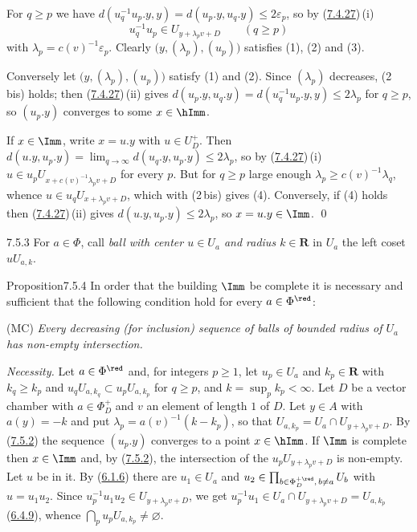 \documentclass[12pt,a4paper,oneside,english]{smfart}
\makeatletter
\newcommand{\btanchor}[1]{\leavevmode\Hy@raisedlink{\hypertarget{bt:#1}{}}}
\newcommand{\btref}[1]{\hyperlink{bt:#1}{#1}}
\theoremstyle{definition}
\theoremstyle{bt}
\makeatother
\begin{document}
For $q\geqslant p$ we have $d(u_q^{-1}u_p.y,y)=d(u_p.y,u_q.y)\leqslant2\varepsilon_p$,
so by (\btref{7.4.27})\,(i)
\begin{equation}
  u_q^{-1}u_p\in U_{y+\lambda_pv+D}\qquad(q\geqslant p) \tag{2\,bis}
\end{equation}
with $\lambda_p=c(v)^{-1}\varepsilon_p$. Clearly $\bigl(y,(\lambda_p),(u_p)\bigr)$
satisfies (1), (2) and (3).

Conversely let $\bigl(y,(\lambda_p),(u_p)\bigr)$ satisfy (1) and (2). Since
$(\lambda_p)$ decreases, (2\,bis) holds; then (\btref{7.4.27})\,(ii) gives
$d(u_p.y,u_q.y)=d(u_q^{-1}u_p.y,y)\leqslant2\lambda_p$ for $q\geqslant p$, so
$(u_p.y)$ converges to some $x\in\hImm$.

If $x\in\Imm$, write $x=u.y$ with $u\in U_D^{+}$. Then
$d(u.y,u_p.y)=\lim_{q\to\infty}d(u_q.y,u_p.y)\leqslant2\lambda_p$, so by
(\btref{7.4.27})\,(i) $u\in u_pU_{x+c(v)^{-1}\lambda_pv+D}$ for every $p$. But for
$q\geqslant p$ large enough $\lambda_p\geqslant c(v)^{-1}\lambda_q$, whence
$u\in u_qU_{x+\lambda_pv+D}$, which with (2\,bis) gives (4). Conversely, if (4)
holds then (\btref{7.4.27})\,(ii) gives $d(u.y,u_p.y)\leqslant2\lambda_p$, so
$x=u.y\in\Imm$. \qed

\num{7.5.3}\btanchor{7.5.3} For $a\in\Phi$, call \emph{ball with center $u\in U_a$ and radius
$k\in\mathbf{R}$} in $U_a$ the left coset $uU_{a,k}$.

\begin{stmt}{Proposition}{7.5.4}\btanchor{7.5.4}
In order that the building $\Imm$ be complete it is necessary and sufficient that
the following condition hold for every $a\in\Phi^{\red}$:

\smallskip
\noindent\textup{(MC)} \emph{Every decreasing (for inclusion) sequence of balls of
bounded radius of $U_a$ has non-empty intersection.}
\end{stmt}

\pf \emph{Necessity.} Let $a\in\Phi^{\red}$ and, for integers $p\geqslant1$, let
$u_p\in U_a$ and $k_p\in\mathbf{R}$ with $k_q\geqslant k_p$ and
$u_qU_{a,k_q}\subset u_pU_{a,k_p}$ for $q\geqslant p$, and $k=\sup_pk_p<\infty$. Let
$D$ be a vector chamber with $a\in\Phi_D^{+}$ and $v$ an element of length $1$ of
$D$. Let $y\in A$ with $a(y)=-k$ and put $\lambda_p=a(v)^{-1}(k-k_p)$, so that
$U_{a,k_p}=U_a\cap U_{y+\lambda_pv+D}$. By (\btref{7.5.2}) the sequence $(u_p.y)$ converges
to a point $x\in\hImm$. If $\Imm$ is complete then $x\in\Imm$ and, by (\btref{7.5.2}), the
intersection of the $u_pU_{y+\lambda_pv+D}$ is non-empty. Let $u$ be in it. By
(\btref{6.1.6}) there are $u_1\in U_a$ and
$u_2\in\prod_{b\in\Phi_D^{+\red},\,b\neq a}U_b$ with $u=u_1u_2$. Since
$u_p^{-1}u_1u_2\in U_{y+\lambda_pv+D}$, we get
$u_p^{-1}u_1\in U_a\cap U_{y+\lambda_pv+D}=U_{a,k_p}$ (\btref{6.4.9}), whence
$\bigcap_pu_pU_{a,k_p}\neq\varnothing$.
\end{document}
